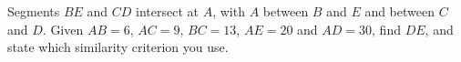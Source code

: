 Segments $BE$ and $CD$ intersect at $A$, with $A$ between $B$ and $E$ and between $C$ and $D$. Given $AB=6$, $AC=9$, $BC=13$, $AE=20$ and $AD=30$, find $DE$, and state which similarity criterion you use.
